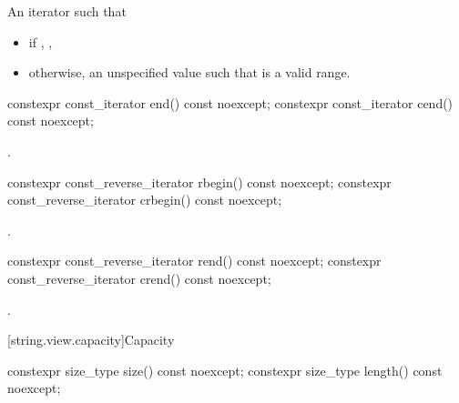 \begin{itemdescr}
\pnum
\returns
An iterator such that
\begin{itemize}
\item if , ,
\item otherwise, an unspecified value such that  is a valid range.
\end{itemize}
\end{itemdescr}

%
%
\begin{itemdecl}
constexpr const_iterator end() const noexcept;
constexpr const_iterator cend() const noexcept;
\end{itemdecl}

\begin{itemdescr}
\pnum
\returns
{}.
\end{itemdescr}

%
%
\begin{itemdecl}
constexpr const_reverse_iterator rbegin() const noexcept;
constexpr const_reverse_iterator crbegin() const noexcept;
\end{itemdecl}

\begin{itemdescr}
\pnum
\returns
{}.
\end{itemdescr}

%
%
\begin{itemdecl}
constexpr const_reverse_iterator rend() const noexcept;
constexpr const_reverse_iterator crend() const noexcept;
\end{itemdecl}

\begin{itemdescr}
\pnum
\returns
{}.
\end{itemdescr}

[string.view.capacity]{Capacity}

%
%
\begin{itemdecl}
constexpr size_type size() const noexcept;
constexpr size_type length() const noexcept;
\end{itemdecl}

